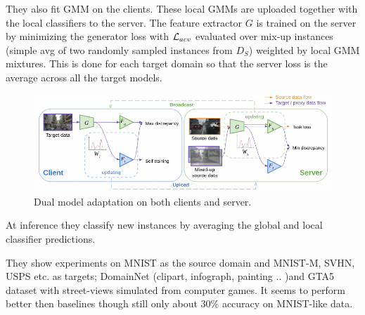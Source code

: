 They also fit GMM on the clients. These local GMMs are uploaded together with the local classifiers to the server. The feature extractor $G$ is trained on the server by minimizing the generator loss with $\mathcal{L}_{acv}$ evaluated over mix-up instances (simple avg of two randomly sampled instances from $D_S$) weighted by local GMM mixtures. This is done for each target domain so that the server loss is the average across all the target models.

\begin{figure}[ht]
\centering
\includegraphics[width=12cm]{fmtda_Figure2.png}
\caption{Dual model adaptation on both clients and server.}
\end{figure}

At inference they classify new instances by averaging the global and local classifier predictions. 

They show experiments on MNIST as the source domain and MNIST-M, SVHN, USPS etc. as targets; DomainNet (clipart, infograph, painting .. )and GTA5 dataset with street-views simulated from computer games. It seems to perform better then baselines though still only about 30\% accuracy on MNIST-like data.

